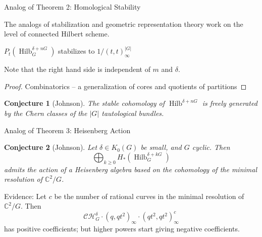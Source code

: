 \documentclass{beamer}
\DeclareMathOperator{\Hilb}{Hilb}
\newcommand{\C}{\mathbb{C}}
\newtheorem{conjecture}{Conjecture}
\begin{document}
\begin{frame}{Analog of Theorem 2: Homological Stability}

The analogs of stabilization and geometric representation theory work on the level of connected Hilbert scheme.

\begin{Theorem}[Johnson] 
$P_t(\Hilb^{\delta+nG}_G)$ stabilizes to $1/(t,t)_\infty^{|G|}$
\end{Theorem}
Note that the right hand side is independent of $m$ and $\delta$.
\begin{proof} Combinatorics -- a generalization of cores and quotients of partitions \end{proof}

\begin{conjecture}[Johnson] 
The stable cohomology of $\Hilb^{\delta+nG}$ is freely generated by the Chern classes of the $|G|$ tautological bundles.
\end{conjecture}

\end{frame}

\begin{frame}{Analog of Theorem 3:  Heisenberg Action}


\begin{conjecture}[Johnson]
Let $\delta\in K_0(G)$ be small, and $G$ cyclic.  Then
$$\bigoplus_{k\geq 0} H_*(\Hilb^{\delta+kG}_G)$$ admits the action of a Heisenberg algebra based on the cohomology of the minimal resolution of $\C^2/G$.
\end{conjecture}
\begin{block}{Evidence:}
Let $c$ be the number of rational curves in the minimal resolution of $\C^2/G$.  Then
$$\mathcal{CH}^\delta_G\cdot(q,qt^2)_\infty\cdot (qt^2,qt^2)_\infty^c$$
has positive coefficients; but higher powers start giving negative coefficients.

\end{block}

\end{frame}
\end{document}
